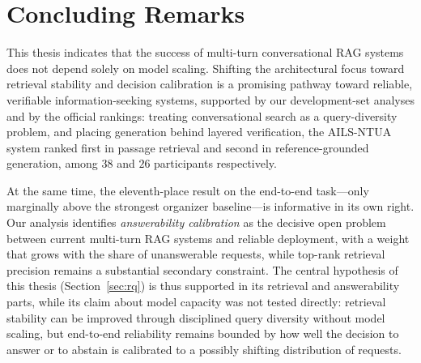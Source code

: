 \section{Concluding Remarks}
\label{sec:concluding-remarks}

This thesis indicates that the success of multi-turn conversational RAG systems does not depend solely on model scaling. Shifting the architectural focus toward retrieval stability and decision calibration is a promising pathway toward reliable, verifiable information-seeking systems, supported by our development-set analyses and by the official rankings: treating conversational search as a query-diversity problem, and placing generation behind layered verification, the AILS-NTUA system ranked first in passage retrieval and second in reference-grounded generation, among $38$ and $26$ participants respectively.

At the same time, the eleventh-place result on the end-to-end task---only marginally above the strongest organizer baseline---is informative in its own right. Our analysis identifies \emph{answerability calibration} as the decisive open problem between current multi-turn RAG systems and reliable deployment, with a weight that grows with the share of unanswerable requests, while top-rank retrieval precision remains a substantial secondary constraint. The central hypothesis of this thesis (Section~\ref{sec:rq}) is thus supported in its retrieval and answerability parts, while its claim about model capacity was not tested directly: retrieval stability can be improved through disciplined query diversity without model scaling, but end-to-end reliability remains bounded by how well the decision to answer or to abstain is calibrated to a possibly shifting distribution of requests.

